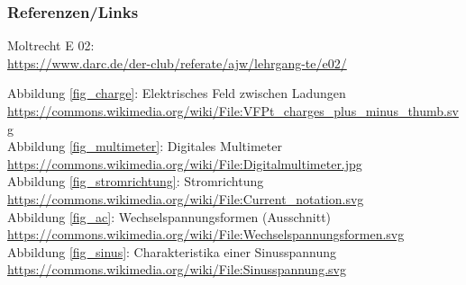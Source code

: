 \begin{frame}
  \frametitle{Referenzen/Links}

  \footnotesize

	\begin{thebibliography}{}
		 Moltrecht E 02: \\
		\url{https://www.darc.de/der-club/referate/ajw/lehrgang-te/e02/}
		
		  Abbildung \ref{fig_charge}: Elektrisches Feld zwischen Ladungen \\
		\url{https://commons.wikimedia.org/wiki/File:VFPt_charges_plus_minus_thumb.svg}\\
		
		  Abbildung \ref{fig_multimeter}: Digitales Multimeter \\
		\url{https://commons.wikimedia.org/wiki/File:Digitalmultimeter.jpg}\\
		
		  Abbildung \ref{fig_stromrichtung}: Stromrichtung \\
		\url{https://commons.wikimedia.org/wiki/File:Current_notation.svg}\\
		
		  Abbildung \ref{fig_ac}: Wechselspannungsformen (Ausschnitt)\\
		\url{https://commons.wikimedia.org/wiki/File:Wechselspannungsformen.svg}\\
		
		  Abbildung \ref{fig_sinus}: Charakteristika einer Sinusspannung\\
		\url{https://commons.wikimedia.org/wiki/File:Sinusspannung.svg}\\

		
	\end{thebibliography}

\end{frame}


